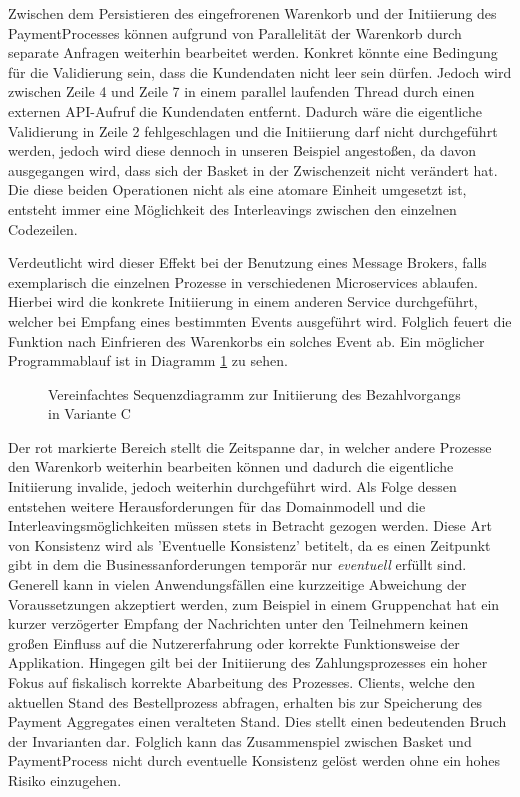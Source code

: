 Zwischen dem Persistieren des eingefrorenen Warenkorb und der Initiierung des PaymentProcesses können aufgrund von Parallelität der Warenkorb durch separate Anfragen weiterhin bearbeitet werden. Konkret könnte eine Bedingung für die Validierung sein, dass die Kundendaten nicht leer sein dürfen. Jedoch wird zwischen Zeile 4 und Zeile 7 in einem parallel laufenden Thread durch einen externen API-Aufruf die Kundendaten entfernt. Dadurch wäre die eigentliche Validierung in Zeile 2 fehlgeschlagen und die Initiierung darf nicht durchgeführt werden, jedoch wird diese dennoch in unseren Beispiel angestoßen, da davon ausgegangen wird, dass sich der Basket in der Zwischenzeit nicht verändert hat. Die diese beiden Operationen nicht als eine atomare Einheit umgesetzt ist, entsteht immer eine Möglichkeit des Interleavings zwischen den einzelnen Codezeilen.

Verdeutlicht wird dieser Effekt bei der Benutzung eines Message Brokers, falls exemplarisch die einzelnen Prozesse in verschiedenen Microservices ablaufen. Hierbei wird die konkrete Initiierung in einem anderen Service durchgeführt, welcher bei Empfang eines bestimmten Events ausgeführt wird. Folglich feuert die Funktion nach Einfrieren des Warenkorbs ein solches Event ab. Ein möglicher Programmablauf ist in Diagramm \ref{fig:VarC-Sequence} zu sehen. 

\begin{figure}[htbp]
	\centering
	
	\caption{Vereinfachtes Sequenzdiagramm zur Initiierung des Bezahlvorgangs in Variante C}
	\label{fig:VarC-Sequence}
\end{figure}

Der rot markierte Bereich stellt die Zeitspanne dar, in welcher andere Prozesse den Warenkorb weiterhin bearbeiten können und dadurch die eigentliche Initiierung invalide, jedoch weiterhin durchgeführt wird. Als Folge dessen entstehen weitere Herausforderungen für das Domainmodell und die Interleavingsmöglichkeiten müssen stets in Betracht gezogen werden. Diese Art von Konsistenz wird als 'Eventuelle Konsistenz' betitelt, da es einen Zeitpunkt gibt in dem die Businessanforderungen temporär nur \emph{eventuell} erfüllt sind. Generell kann in vielen Anwendungsfällen eine kurzzeitige Abweichung der Voraussetzungen akzeptiert werden, zum Beispiel in einem Gruppenchat hat ein kurzer verzögerter Empfang der Nachrichten unter den Teilnehmern keinen großen Einfluss auf die Nutzererfahrung oder korrekte Funktionsweise der Applikation. Hingegen gilt bei der Initiierung des Zahlungsprozesses ein hoher Fokus auf fiskalisch korrekte Abarbeitung des Prozesses. Clients, welche den aktuellen Stand des Bestellprozess abfragen, erhalten bis zur Speicherung des Payment Aggregates einen veralteten Stand. Dies stellt einen bedeutenden Bruch der Invarianten dar. Folglich kann das Zusammenspiel zwischen Basket und PaymentProcess nicht durch eventuelle Konsistenz gelöst werden ohne ein hohes Risiko einzugehen.

